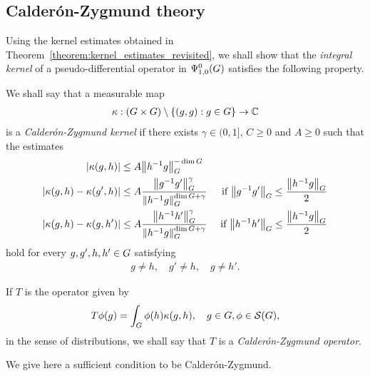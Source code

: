 \subsection{Calder\'on-Zygmund theory}

Using the kernel estimates obtained in Theorem~\ref{theorem:kernel_estimates_revisited},
we shall show that the \emph{integral kernel} of a pseudo-differential operator in $\OperatorClass 0 {1, 0}$ satisfies the following property.

\begin{definition}
    We shall say that a measurable map
    \begin{align*}
        \kappa : (\Group \times \Group) \setminus \{(g, g) : g \in \Group\} \to \C
    \end{align*}
    is a \emph{Calder\'on-Zygmund kernel}
    if there exists $\gamma \in (0, 1]$,
    $C \geq 0$ and $A \geq 0$ such that the estimates
    \begin{align*}
        \abs {\kappa(g, h)} &\leq A \norm [\Group] {h^{-1} g}^{-\dim \Group} &\\
        \abs {\kappa(g, h) - \kappa(g', h)} &\leq A \frac {\norm [\Group] {g^{-1} g'}^{\gamma}} {\norm [\Group] {h^{-1} g}^{\dim \Group + \gamma}}
        &\text{ if } \norm [\Group] {g^{-1} g'} \leq \frac {\norm [\Group] {h^{-1} g}} 2\\
        \abs {\kappa(g, h) - \kappa(g, h')} &\leq A \frac {\norm [\Group] {h^{-1} h'}^{\gamma}} {\norm [\Group] {h^{-1} g}^{\dim \Group + \gamma}}
        &\text{ if } \norm [\Group] {h^{-1} h'} \leq \frac {\norm [\Group] {h^{-1} g}} 2
    \end{align*}
    hold for every $g, g', h, h' \in \Group$ satisfying
    \begin{align*}
        g \neq h, \quad
        g' \neq h, \quad
        g \neq h'.
    \end{align*}

    If $T$ is the operator given by
    \begin{align*}
        T \phi(g) = \int_\Group \phi(h) \kappa(g, h),
        \quad g \in \Group, \phi \in \Schwartz \Group,
    \end{align*}
    in the sense of distributions,
    we shall say that $T$ is a \emph{Calder\'on-Zygmund operator}.
\end{definition}

We give here a sufficient condition to be Calder\'on-Zygmund.

